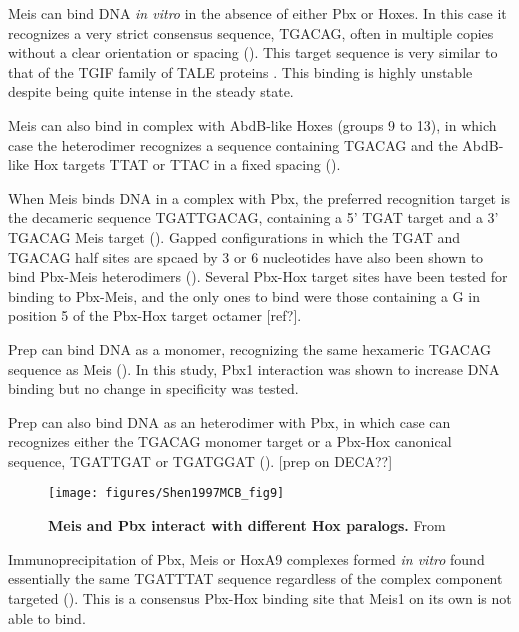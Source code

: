 Meis can bind DNA \textit{in vitro} in the absence of either Pbx or Hoxes. In this case it recognizes a very strict consensus sequence, TGACAG, often in multiple copies without a clear orientation or spacing (\cite{Shen1997}). This target sequence is very similar to that of the TGIF family of TALE proteins \cite{ref}. This binding is highly unstable despite being quite  intense in the steady state. 

Meis can also bind in complex with AbdB-like Hoxes (groups 9 to 13), in which case the heterodimer recognizes a sequence containing TGACAG and the AbdB-like Hox targets TTAT or TTAC in a fixed spacing (\cite{Shen1997}). 

When Meis binds DNA in a complex with Pbx, the preferred recognition target is the decameric sequence TGATTGACAG, containing a 5' TGAT target and a 3' TGACAG Meis target (\cite{Chang1997}). Gapped configurations in which the TGAT and TGACAG half sites are spcaed by 3 or 6 nucleotides have also been shown to bind Pbx-Meis heterodimers (\cite{Jacobs1999}). Several Pbx-Hox target sites have been tested for binding to Pbx-Meis, and the only ones to bind were those containing a G in position 5 of the Pbx-Hox target octamer [ref?]. 

Prep can bind DNA as a monomer, recognizing the same hexameric TGACAG sequence as Meis (\cite{Berthelsen1998a}). In this study, Pbx1 interaction was shown to increase DNA binding but no change in specificity was tested.

Prep can also bind DNA as an heterodimer with Pbx, in which case can recognizes either the TGACAG monomer target or a Pbx-Hox canonical sequence, TGATTGAT or TGATGGAT (\cite{Berthelsen1998}). [prep on DECA??]


\begin{figure}[]
  
  \centering
  \texttt{[image: figures/Shen1997MCB\_fig9]}
  \caption[Meis and Pbx interact with different Hox paralogs]{\textbf{Meis and Pbx interact with different Hox paralogs.} From \cite{Shen1997}}
  \label{fig:Shen1997MCB_fig9}
\end{figure}


Immunoprecipitation of Pbx, Meis or HoxA9 complexes formed \textit{in vitro} found essentially the same TGATTTAT sequence regardless of the complex component targeted (\cite{Shen1999}). This is a consensus Pbx-Hox binding site that Meis1 on its own is not able to bind.

